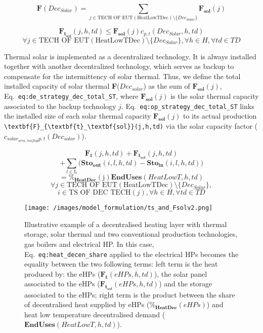 \documentclass[
]{article}
\begin{document}
{\[\textbf{F} (Dec_{Solar}) = \sum_{j \in \text{TECH OF EUT} (\text{HeatLowTDec}) \setminus \{ Dec_{Solar} \}} \textbf{F}_\textbf{sol} (j)\]}

{\[\textbf{F}_{\textbf{t}_\textbf{sol}} (j,h,td) \leq  \textbf{F}_\textbf{sol} (j)  c_{p,t}(Dec_{Solar},h,td)\]\[\forall j \in \text{TECH OF EUT} (\text{HeatLowTDec}) \setminus \{ Dec_{Solar} \}, \forall h\in H, \forall td \in TD\]}

Thermal solar is implemented as a decentralized technology. It is always
installed together with another decentralized technology, which serves
as backup to compensate for the intermittency of solar thermal. Thus, we
define the total installed capacity of solar thermal
\textbf{F}(\(Dec_{solar}\)) as the sum of
\(\textbf{F}_{\textbf{sol}}(j)\),
Eq.~\texttt{eq:de\_strategy\_dec\_total\_ST}, where
\(\textbf{F}_{\textbf{sol}}(j)\) is the solar thermal capacity
associated to the backup technology \(j\).
Eq.~\texttt{eq:op\_strategy\_dec\_total\_ST} links the installed size of
each solar thermal capacity \(\textbf{F}_{\textbf{sol}}(j)\) to its
actual production
\texttt{\textbackslash{}textbf\{F\}\_\{\textbackslash{}textbf\{t\}\_\textbackslash{}textbf\{sol\}\}(j,h,td)}
via the solar capacity factor
(\(c_{solar_{area,rooftop}p,t}(Dec_{solar})\)).

{\[\textbf{F}_\textbf{t} (j,h,td) + \textbf{F}_{\textbf{t}_\textbf{sol}} (j,h,td)\]\[+ \sum_{l \in \text{L}}\Big( \textbf{Sto}_\textbf{out} (i,l,h,td) - \textbf{Sto}_\textbf{in} (i,l,h,td) \Big)\]\[= \textbf{\%}_\textbf{HeatDec}(\text{j}) \textbf{EndUses}(HeatLowT,h,td)
\]\[\forall j \in \text{TECH OF EUT} (\text{HeatLowTDec}) \setminus \{ Dec_{Solar} \},\]\[i \in \text{TS OF DEC TECH}(j)  , \forall h\in H, \forall td \in TD\]}

\begin{figure}
\centering
\texttt{[image: /images/model\_formulation/ts\_and\_Fsolv2.png]}
\caption{Illustrative example of a decentralised heating layer with
thermal storage, solar thermal and two conventional production
technologies, gas boilers and electrical HP. In this case,
Eq.~\texttt{eq:heat\_decen\_share} applied to the electrical HPs becomes
the equality between the two following terms: left term is the heat
produced by: the eHPs (\(\textbf{F}_{\textbf{t}}(eHPs,h,td)\)), the
solar panel associated to the eHPs
(\(\textbf{F}_{\textbf{t}_\textbf{sol}}(eHPs,h,td)\)) and the storage
associated to the eHPs; right term is the product between the share of
decentralised heat supplied by eHPs
(\(\textbf{\%}_{\textbf{HeatDec}}(eHPs)
\)) and heat low temperature decentralised demand
(\(\textbf{EndUses}(HeatLowT,h,td)\)).}
\end{figure}
\end{document}
